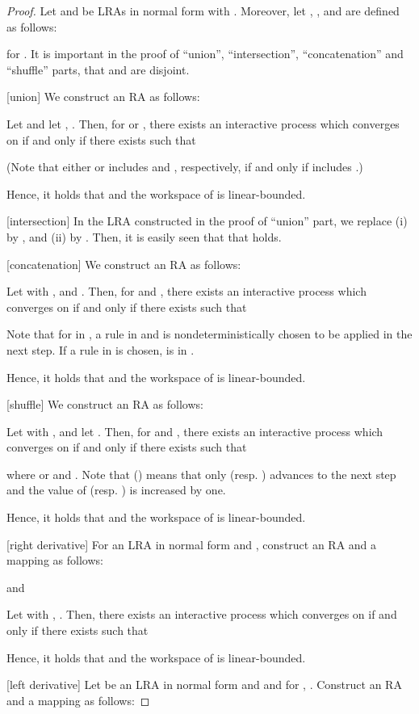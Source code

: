 \documentclass[preprint,fleqn,1p]{elsarticle}
\begin{document}
\begin{proof}
Let  and  be LRAs in normal form with . Moreover, let , ,   and  are defined as follows:

for . It is important in the proof of ``union'', ``intersection'', ``concatenation'' and ``shuffle'' parts, that  and  are disjoint.

[union] We construct an RA  as follows:

Let  and let , . Then, for  or , there exists an interactive process  which converges on  if and only if there exists  such that

(Note that either  or  includes  and , respectively, if and only if  includes .) 

Hence, it holds that  and the workspace of  is linear-bounded.

[intersection] In the LRA  constructed in the proof of ``union'' part,  we replace (i) 
 by , and 
(ii)  by . Then, it is easily seen that  that 
 holds.

[concatenation] We construct an RA  as follows:

Let  with ,  and . Then, for  and , there exists an interactive process  which converges on  if and only if there exists  such that

Note that for  in , a rule in  and  is nondeterministically chosen to be applied in the next step. If a rule in  is chosen,  is in . 

Hence, it holds that  and the workspace of  is linear-bounded.

[shuffle] We construct an RA  as follows:

Let  with ,  and let . Then, for  and , there exists an interactive process  which converges on  if and only if there exists  such that

where  or  and . Note that  () means that only  (resp. ) advances to the next step and the value of  (resp. ) is increased by one. 
 
Hence, it holds that  and the workspace of  is linear-bounded.

[right derivative]  For an LRA  in normal form and , construct an RA  and a mapping  as follows:

and

Let  with , . Then, there exists an interactive process  which converges on  if and only if there exists  such that

Hence, it holds that  and the workspace of  is linear-bounded.

[left derivative] Let  be an LRA in normal form and  and  for , .  Construct an RA  and a mapping  as follows:


\end{proof}
\end{document}
